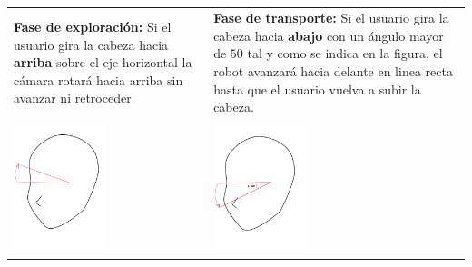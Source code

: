 \documentclass[twoside, 11pt]{epstfg}
\begin{document}
\begin{table}[H]
	\begin{tabular}{p{7.0cm}  p{7.0cm}}
		\textbf{Fase de exploración:} Si el usuario gira la cabeza hacia \textbf{arriba} sobre el eje horizontal la cámara rotará hacia arriba sin avanzar ni retroceder & \textbf{Fase de transporte:} Si el usuario gira la cabeza hacia \textbf{abajo} con un ángulo mayor de $50$ tal y como se indica en la figura, el robot avanzará hacia delante en linea recta hasta que el usuario vuelva a subir la cabeza. \\
		\centering\includegraphics[height=1.5in]{images/movupbuena.png} & \centering\includegraphics[height=1.5in]{images/movdownbuena.png}\\
	\end{tabular}
		\caption{}
		\label{movRobotV}
\end{table}
\end{document}
